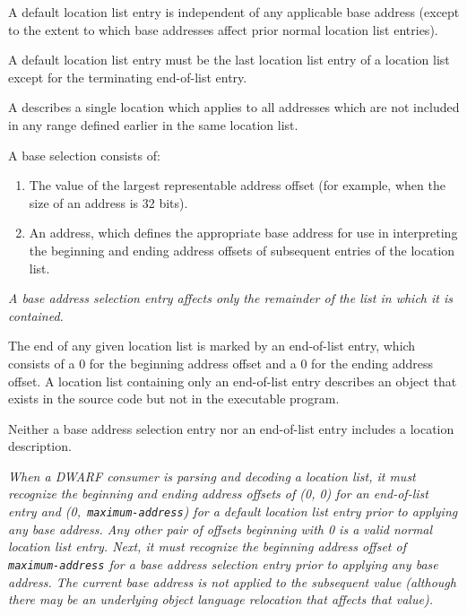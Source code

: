 A default location list entry is independent of any applicable
base address (except to the extent to which base addresses
affect prior normal location list entries).

A default location list entry must be the last location list
entry of a location list except for the terminating end-of-list
entry.

A  describes a \bb single \eb 
location which applies to all addresses which are not included 
in any range defined earlier in the same location list.

A base 
selection 
consists of:
\begin{enumerate}[1. ]
\item The value of the largest representable 
address offset (for example, \wffffffff when the size of
an address is 32 bits).
\item An address, which defines the 
appropriate base address for use in interpreting the beginning
and ending address offsets of subsequent entries of the location list.
\end{enumerate}

\textit{A base address selection entry 
affects only the remainder of the list in which it is contained.}

The end of any given location list is marked by an 
end-of-list entry, which consists of a 0 for the beginning address
offset and a 0 for the ending address offset. A location list
containing only an 
end-of-list entry describes an object that
exists in the source code but not in the executable program.

Neither a base address selection entry nor an end-of-list
entry includes a location description.

\textit{When a DWARF consumer is parsing and decoding a location
list, it must recognize the beginning and ending address
offsets of (0, 0) for an end-of-list entry and 
\mbox{(0, \texttt{maximum-address})} for
a default location list entry prior to applying any base
address. Any other pair of offsets beginning with 0 is a
valid normal location list entry. Next, it must recognize the
beginning address offset of \texttt{maximum-address} for a base address selection
entry prior to applying any base address. The current base
address is not applied to the subsequent value (although there
may be an underlying object language relocation that affects
that value).}

